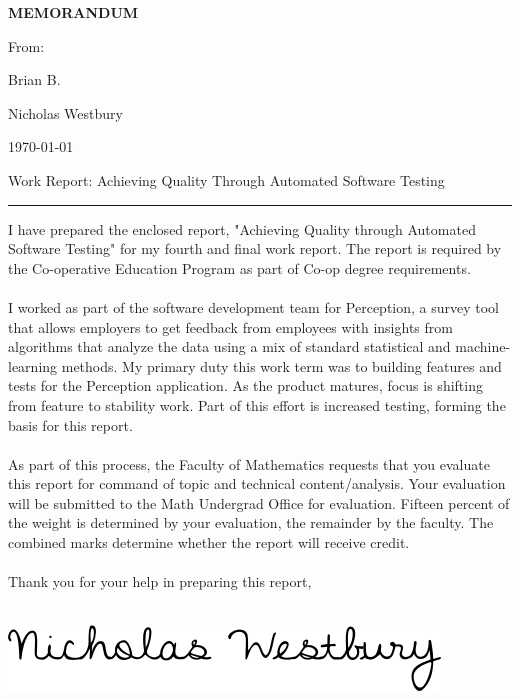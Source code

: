 \documentclass[12pt]{report}
\newcommand{\HRule}[1]{\rule{\linewidth}{#1}}
\begin{document}
\newpage\noindent\thispagestyle{empty}
\linespread{1.2}
\LARGE\textbf{\uppercase{MEMORANDUM}} \normalsize
\vspace*{-10pt}
\begin{singlespacing}\noindent
\begin{labeling}{From:\ \ \ \ \ \ \ }
    \item [To:] Brian B.
    \item [From:] Nicholas Westbury
    \item [Date:] \today
    \item [Re:] Work Report: Achieving Quality Through Automated Software Testing
\end{labeling}
\end{singlespacing}
\vspace*{-10pt}
\HRule{1.5pt}
\begin{singlespacing}\noindent
I have prepared the enclosed report, "Achieving Quality through Automated Software Testing" for my fourth and final work report. The report is required by the Co-operative Education Program as part of Co-op degree requirements. \\ \\ \noindent 
I worked as part of the software development team for Perception, a survey tool that allows employers to get feedback from employees with insights from algorithms that analyze the data using a mix of standard statistical and machine-learning methods. My primary duty this work term was to building features and tests for the Perception application. As the product matures, focus is shifting from feature to stability work. Part of this effort is increased testing, forming the basis for this report. \\ \\ \noindent
As part of this process, the Faculty of Mathematics requests that you evaluate this report for command of topic and technical content/analysis. Your evaluation will be submitted to the Math Undergrad Office for evaluation. Fifteen percent of the weight is determined by your evaluation, the remainder by the faculty. The combined marks determine whether the report will receive credit. \\ \\
Thank you for your help in preparing this report,\\ \\ \noindent
\end{singlespacing}
\includegraphics[scale=0.55]{signature}
\linespread{2}
\end{document}
